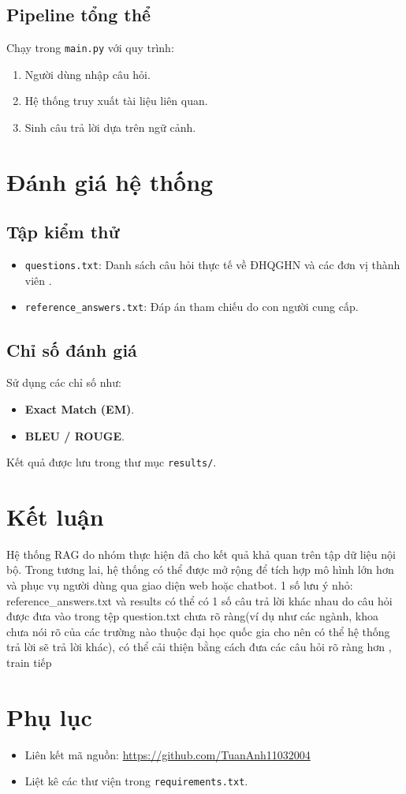 \documentclass[12pt]{article}
\begin{document}
\subsection{Pipeline tổng thể}
Chạy trong \texttt{main.py} với quy trình:
\begin{enumerate}
    \item Người dùng nhập câu hỏi.
    \item Hệ thống truy xuất tài liệu liên quan.
    \item Sinh câu trả lời dựa trên ngữ cảnh.
\end{enumerate}

\section{Đánh giá hệ thống}
\subsection{Tập kiểm thử}
\begin{itemize}
    \item \texttt{questions.txt}: Danh sách câu hỏi thực tế về ĐHQGHN và các đơn vị thành viên .
    \item \texttt{reference\_answers.txt}: Đáp án tham chiếu do con người cung cấp.
\end{itemize}

\subsection{Chỉ số đánh giá}
Sử dụng các chỉ số như:
\begin{itemize}
    \item \textbf{Exact Match (EM)}.
    \item \textbf{BLEU / ROUGE}.
\end{itemize}
Kết quả được lưu trong thư mục \texttt{results/}.

\section{Kết luận}
Hệ thống RAG do nhóm thực hiện đã cho kết quả khả quan trên tập dữ liệu nội bộ. Trong tương lai, hệ thống có thể được mở rộng để tích hợp mô hình lớn hơn và phục vụ người dùng qua giao diện web hoặc chatbot.
 1 số lưu ý nhỏ: reference_answers.txt và results có thể có 1 số câu trả lời khác nhau do câu hỏi được đưa vào trong tệp question.txt chưa rõ ràng(ví dụ như các ngành, khoa chưa nói rõ của các trường nào thuộc đại học quốc gia cho nên có thể hệ thống trả lời sẽ trả lời khác), có thể cải thiện bằng cách đưa các câu hỏi rõ ràng hơn , train tiếp 

\section*{Phụ lục}
\begin{itemize}
    \item Liên kết mã nguồn: \url{https://github.com/TuanAnh11032004}
    \item Liệt kê các thư viện trong \texttt{requirements.txt}.
\end{itemize}
\end{document}
